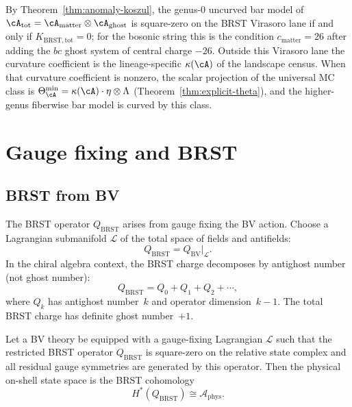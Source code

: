 \begin{remark}\label{rem:anomaly-curvature-bv}
By Theorem~\ref{thm:anomaly-koszul}, the genus-$0$ uncurved bar
model of
$\cA_{\mathrm{tot}}=\cA_{\mathrm{matter}}\otimes\cA_{\mathrm{ghost}}$
is square-zero on the BRST Virasoro lane if and only if
$K_{\mathrm{BRST,tot}}=0$; for the bosonic string this is the
condition $c_{\mathrm{matter}}=26$ after adding the $bc$ ghost system
of central charge $-26$. Outside this Virasoro lane the curvature
coefficient is the lineage-specific $\kappa(\cA)$ of the landscape
census. When that curvature coefficient is nonzero, the scalar
projection of the universal MC class is
$\Theta_\cA^{\min}=\kappa(\cA)\cdot\eta\otimes\Lambda$
\textup{(}Theorem~\ref{thm:explicit-theta}\textup{)}, and the
higher-genus fiberwise bar model is curved by this class.
\end{remark}

\section{Gauge fixing and BRST}

\subsection{BRST from BV}

\begin{definition}
\label{def:brst-operator}
The BRST operator $Q_{\mathrm{BRST}}$ arises from gauge fixing the BV action.
Choose a Lagrangian submanifold $\mathcal{L}$ of the total space of fields and
antifields:
\[
Q_{\mathrm{BRST}} = Q_{\mathrm{BV}}\big|_{\mathcal{L}}.
\]
In the chiral algebra context, the BRST charge decomposes by antighost number
(not ghost number):
\[
Q_{\mathrm{BRST}} = Q_0 + Q_1 + Q_2 + \cdots,
\]
where $Q_k$ has antighost number~$k$ and operator dimension~$k-1$.
The total BRST charge has definite ghost number~$+1$.
\end{definition}

\begin{theorem}
\label{thm:brst-physical-states}
Let a BV theory be equipped with a gauge-fixing Lagrangian
$\mathcal L$ such that the restricted BRST operator
$Q_{\mathrm{BRST}}$ is square-zero on the relative state complex and
all residual gauge symmetries are generated by this operator. Then
the physical on-shell state space is the BRST cohomology
\[
H^*(Q_{\mathrm{BRST}})\cong \mathcal A_{\mathrm{phys}}.
\]
\end{theorem}

